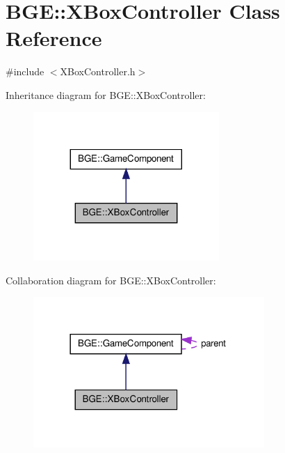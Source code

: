 \hypertarget{class_b_g_e_1_1_x_box_controller}{\section{B\-G\-E\-:\-:X\-Box\-Controller Class Reference}
\label{class_b_g_e_1_1_x_box_controller}
}


{\ttfamily \#include $<$X\-Box\-Controller.\-h$>$}



Inheritance diagram for B\-G\-E\-:\-:X\-Box\-Controller\-:
\nopagebreak
\begin{figure}[H]
\begin{center}
\leavevmode
\includegraphics[width=200pt]{class_b_g_e_1_1_x_box_controller__inherit__graph}
\end{center}
\end{figure}


Collaboration diagram for B\-G\-E\-:\-:X\-Box\-Controller\-:
\nopagebreak
\begin{figure}[H]
\begin{center}
\leavevmode
\includegraphics[width=249pt]{class_b_g_e_1_1_x_box_controller__coll__graph}
\end{center}
\end{figure}
